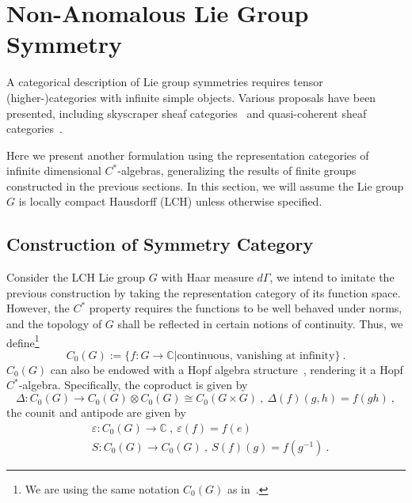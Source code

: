 \documentclass[a4paper,11pt]{article}
\newcommand{\be}{\begin{equation}}
\newcommand{\ee}{\end{equation}}
\newcommand{\ba}{\begin{aligned}}
\newcommand{\ea}{\end{aligned}}
\def\bbC{\mathbb{C}}
\begin{document}
\section{Non-Anomalous Lie Group Symmetry}\label{sec:non-anomalous}
A categorical description of Lie group symmetries requires tensor (higher-)categories with infinite simple objects. Various proposals have been presented, including skyscraper sheaf categories~\cite{Freed:2009qp,Jia:2025vrj} and quasi-coherent sheaf categories~\cite{Jia:2025vrj,Stockall:2025ngz}.

Here we present another formulation using the representation categories of infinite dimensional $C^*$-algebras, generalizing the results of finite groups constructed in the previous sections. In this section, we will assume the Lie group $G$ is locally compact Hausdorff (LCH) unless otherwise specified.

\subsection{Construction of Symmetry Category}
Consider the LCH Lie group $G$ with Haar measure $d\Gamma$, we intend to imitate the previous construction by taking the representation category of its function space. However, the $C^*$ property requires the functions to be well behaved under norms, and the topology of $G$ shall be reflected in certain notions of continuity. Thus, we define\footnote{We are using the same notation $C_0(G)$ as in~\cite{Marin-Salvador:2025stc}.}
\be
C_0(G) := \{ f: G\to \bbC | \text{continuous, vanishing at infinity}  \} \ .
\ee
$C_0(G)$ can also be endowed with a Hopf algebra structure~\cite{Etingof:2024abc}, rendering it a Hopf $C^*$-algebra. Specifically, the coproduct is given by
\be
\Delta: C_0(G) \to C_0(G)\otimes C_0(G)\cong C_0(G\times G)\ , \ \Delta(f)(g,h) = f(gh) \ ,
\ee
the counit and antipode are given by
\be\ba
&\varepsilon:C_0(G) \to \bbC \ , \ \varepsilon(f) = f(e)\\
&S:C_0(G) \to C_0(G) \ , \ S(f)(g) = f(g^{-1}) \ .
\ea\ee
\end{document}
